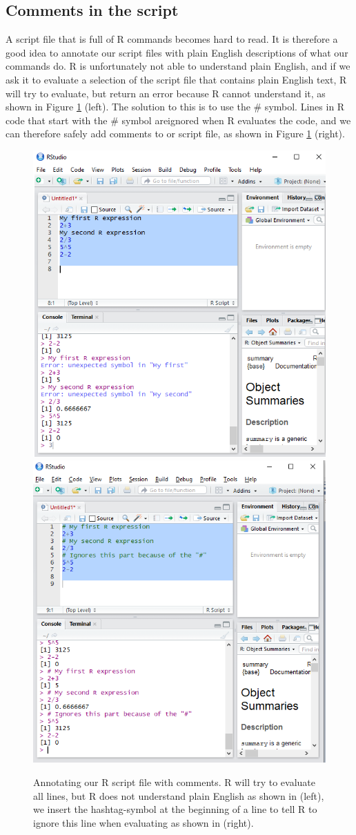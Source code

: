 \documentclass[]{book}
\begin{document}
\hypertarget{comments-in-the-script}{%
\subsection*{Comments in the script}\label{comments-in-the-script}}

A script file that is full of R commands becomes hard to read. It is therefore a good idea to annotate our script files with plain English descriptions of what our commands do. R is unfortunately not able to understand plain English, and if we ask it to evaluate a selection of the script file that contains plain English text, R will try to evaluate, but return an error because R cannot understand it, as shown in Figure \ref{fig:rguide6} (left). The solution to this is to use the \# symbol. Lines in R code that start with the \# symbol areignored when R evaluates the code, and we can therefore safely add comments to or script file, as shown in Figure \ref{fig:rguide6} (right).

\begin{figure}

{\centering \includegraphics[width=0.5\linewidth]{_resources/chapter_Rbasic/r3} \includegraphics[width=0.5\linewidth]{_resources/chapter_Rbasic/r4} 

}

\caption{Annotating our R script file with comments. R will try to evaluate all lines, but R does not understand plain English as shown in (left), we insert the hashtag-symbol at the beginning of a line to tell R to ignore this line when evaluating as shown in (right). }\label{fig:rguide6}
\end{figure}
\end{document}
